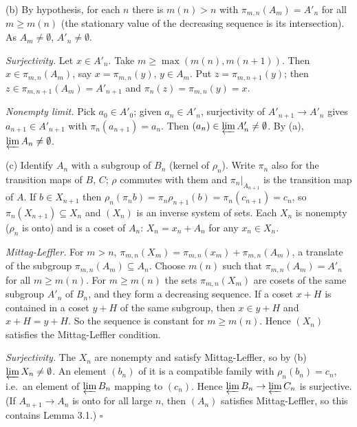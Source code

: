 \documentclass[11pt]{article}
\begin{document}
(b) By hypothesis, for each $n$ there is $m(n)>n$ with $\pi_{m,n}(A_m)=A'_n$ for all $m\ge m(n)$ (the stationary value of the decreasing sequence is its intersection). As $A_m\ne\emptyset$, $A'_n\ne\emptyset$.

\emph{Surjectivity.} Let $x\in A'_n$. Take $m\ge\max(m(n),m(n+1))$. Then $x\in\pi_{m,n}(A_m)$, say $x=\pi_{m,n}(y)$, $y\in A_m$. Put $z=\pi_{m,n+1}(y)$; then $z\in\pi_{m,n+1}(A_m)=A'_{n+1}$ and $\pi_n(z)=\pi_{m,n}(y)=x$.

\emph{Nonempty limit.} Pick $a_0\in A'_0$; given $a_n\in A'_n$, surjectivity of $A'_{n+1}\to A'_n$ gives $a_{n+1}\in A'_{n+1}$ with $\pi_n(a_{n+1})=a_n$. Then $(a_n)\in\varprojlim A'_n\ne\emptyset$. By (a), $\varprojlim A_n\ne\emptyset$.

(c) Identify $A_n$ with a subgroup of $B_n$ (kernel of $\rho_n$). Write $\pi_n$ also for the transition maps of $B$, $C$; $\rho$ commutes with them and $\pi_n|_{A_{n+1}}$ is the transition map of $A$. If $b\in X_{n+1}$ then $\rho_n(\pi_n b)=\pi_n\rho_{n+1}(b)=\pi_n(c_{n+1})=c_n$, so $\pi_n(X_{n+1})\subseteq X_n$ and $(X_n)$ is an inverse system of sets. Each $X_n$ is nonempty ($\rho_n$ is onto) and is a coset of $A_n$: $X_n=x_n+A_n$ for any $x_n\in X_n$.

\emph{Mittag-Leffler.} For $m>n$, $\pi_{m,n}(X_m)=\pi_{m,n}(x_m)+\pi_{m,n}(A_m)$, a translate of the subgroup $\pi_{m,n}(A_m)\subseteq A_n$. Choose $m(n)$ such that $\pi_{m,n}(A_m)=A'_n$ for all $m\ge m(n)$. For $m\ge m(n)$ the sets $\pi_{m,n}(X_m)$ are cosets of the same subgroup $A'_n$ of $B_n$, and they form a decreasing sequence. If a coset $x+H$ is contained in a coset $y+H$ of the same subgroup, then $x\in y+H$ and $x+H=y+H$. So the sequence is constant for $m\ge m(n)$. Hence $(X_n)$ satisfies the Mittag-Leffler condition.

\emph{Surjectivity.} The $X_n$ are nonempty and satisfy Mittag-Leffler, so by (b) $\varprojlim X_n\ne\emptyset$. An element $(b_n)$ of it is a compatible family with $\rho_n(b_n)=c_n$, i.e.\ an element of $\varprojlim B_n$ mapping to $(c_n)$. Hence $\varprojlim B_n\to\varprojlim C_n$ is surjective. (If $A_{n+1}\to A_n$ is onto for all large $n$, then $(A_n)$ satisfies Mittag-Leffler, so this contains Lemma 3.1.) \hfill$\square$
\end{document}
